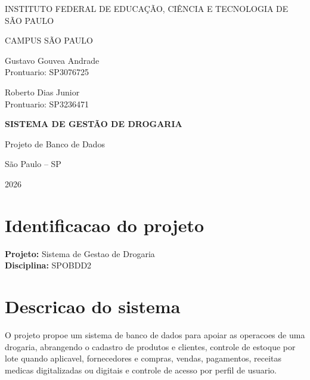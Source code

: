 \documentclass[12pt,a4paper]{article}
\begin{document}
\begin{titlepage}
\thispagestyle{empty}
\begin{center}
{\normalsize INSTITUTO FEDERAL DE EDUCAÇÃO, CIÊNCIA E TECNOLOGIA DE SÃO PAULO\par}
{\normalsize CAMPUS SÃO PAULO\par}
\vspace{2.5cm}

{\normalsize Gustavo Gouvea Andrade\\Prontuario: SP3076725\par}
\vspace{0.4cm}
{\normalsize Roberto Dias Junior\\Prontuario: SP3236471\par}

\vspace*{\fill}
{\bfseries\MakeUppercase{Sistema de Gestão de Drogaria}\par}
\vspace{0.6cm}
{\normalsize Projeto de Banco de Dados\par}
\vspace*{\fill}



\vspace*{\fill}
{\normalsize São Paulo -- SP\par}
{\normalsize 2026\par}
\end{center}
\end{titlepage}

\begingroup
\small
\singlespacing
\tableofcontents
\endgroup
\clearpage

\section{Identificacao do projeto}
\textbf{Projeto:} Sistema de Gestao de Drogaria\\
\textbf{Disciplina:} SPOBDD2

\section{Descricao do sistema}
O projeto propoe um sistema de banco de dados para apoiar as operacoes de uma drogaria, abrangendo o cadastro de produtos e clientes, controle de estoque por lote quando aplicavel, fornecedores e compras, vendas, pagamentos, receitas medicas digitalizadas ou digitais e controle de acesso por perfil de usuario.
\end{document}
